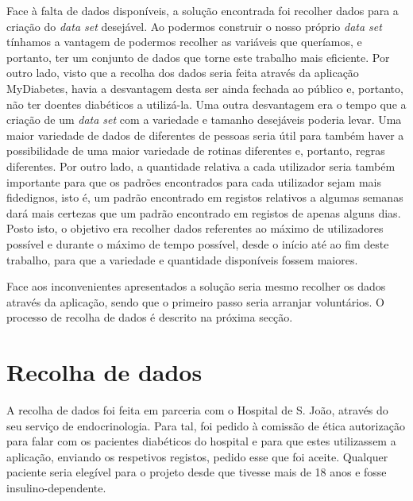 Face à falta de dados disponíveis, a solução encontrada foi recolher dados para a criação do \textit{data set} desejável. Ao podermos construir o nosso próprio \textit{data set} tínhamos a vantagem de podermos recolher as variáveis que queríamos, e portanto, ter um conjunto de dados que torne este trabalho mais eficiente. Por outro lado, visto que a recolha dos dados seria feita através da aplicação MyDiabetes, havia a desvantagem desta ser ainda fechada ao público e, portanto, não ter doentes diabéticos a utilizá-la. Uma outra desvantagem era o tempo que a criação de um \textit{data set} com a variedade e tamanho desejáveis poderia levar. Uma maior variedade de dados de diferentes de pessoas seria útil para também haver a possibilidade de uma maior variedade de rotinas diferentes e, portanto, regras diferentes. Por outro lado, a quantidade relativa a cada utilizador seria também importante para que os padrões encontrados para cada utilizador sejam mais fidedignos, isto é, um padrão encontrado em registos relativos a algumas semanas dará mais certezas que um padrão encontrado em registos de apenas alguns dias. Posto isto, o objetivo era recolher dados referentes ao máximo de utilizadores possível e durante o máximo de tempo possível, desde o início até ao fim deste trabalho, para que a variedade e quantidade disponíveis fossem maiores.

Face aos inconvenientes apresentados a solução seria mesmo recolher os dados através da aplicação, sendo que o primeiro passo seria arranjar voluntários. O processo de recolha de dados é descrito na próxima secção.

\section{Recolha de dados}

A recolha de dados foi feita em parceria com o Hospital de S. João, através do seu serviço de endocrinologia. Para tal, foi pedido à comissão de ética autorização para falar com os pacientes diabéticos do hospital e para que estes utilizassem a aplicação, enviando os respetivos registos, pedido esse que foi aceite. Qualquer paciente seria elegível para o projeto desde que tivesse mais de 18 anos e fosse insulino-dependente. 

